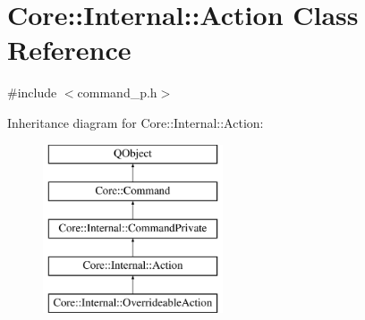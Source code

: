 \hypertarget{class_core_1_1_internal_1_1_action}{\section{Core\-:\-:Internal\-:\-:Action Class Reference}
\label{class_core_1_1_internal_1_1_action}
}


{\ttfamily \#include $<$command\-\_\-p.\-h$>$}

Inheritance diagram for Core\-:\-:Internal\-:\-:Action\-:\begin{figure}[H]
\begin{center}
\leavevmode
\includegraphics[height=5.000000cm]{class_core_1_1_internal_1_1_action}
\end{center}
\end{figure}

